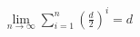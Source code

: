 \documentclass[preview]{standalone}
\begin{document}
\begin{align*}
\lim_{n \to \infty}\sum_{i=1}^{n}\left(\frac{d}{2}\right)^i = d
\end{align*}
\end{document}
